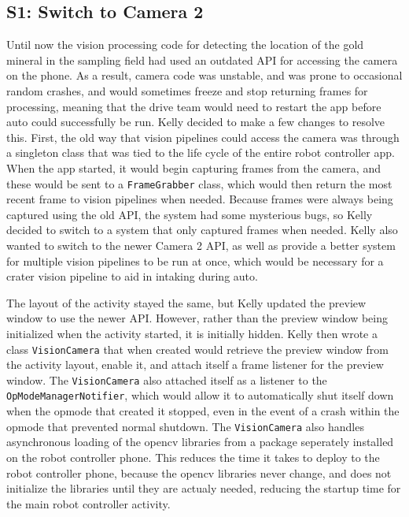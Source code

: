 \documentclass{article}
\begin{document}
\subsection{S1: Switch to Camera 2}

Until now the vision processing code for detecting the location of the gold mineral in the sampling field had used an outdated API for accessing the camera on the phone. As a result, camera code was unstable, and was prone to occasional random crashes, and would sometimes freeze and stop returning frames for processing, meaning that the drive team would need to restart the app before auto could successfully be run. Kelly decided to make a few changes to resolve this. First, the old way that vision pipelines could access the camera was through a singleton class that was tied to the life cycle of the entire robot controller app. When the app started, it would begin capturing frames from the camera, and these would be sent to a \texttt{FrameGrabber} class, which would then return the most recent frame to vision pipelines when needed. Because frames were always being captured using the old API, the system had some mysterious bugs, so Kelly decided to switch to a system that only captured frames when needed. Kelly also wanted to switch to the newer Camera 2 API, as well as provide a better system for multiple vision pipelines to be run at once, which would be necessary for a crater vision pipeline to aid in intaking during auto.

The layout of the activity stayed the same, but Kelly updated the preview window to use the newer API. However, rather than the preview window being initialized when the activity started, it is initially hidden. Kelly then wrote a class \texttt{VisionCamera} that when created would retrieve the preview window from the activity layout, enable it, and attach itself a frame listener for the preview window. The  \texttt{VisionCamera} also attached itself as a listener to the \texttt{OpModeManagerNotifier}, which would allow it to automatically shut itself down when the opmode that created it stopped, even in the event of a crash within the opmode that prevented normal shutdown. The \texttt{VisionCamera} also handles asynchronous loading of the opencv libraries from a package seperately installed on the robot controller phone. This reduces the time it takes to deploy to the robot controller phone, because the opencv libraries never change, and does not initialize the libraries until they are actualy needed, reducing the startup time for the main robot controller activity. 
\end{document}
